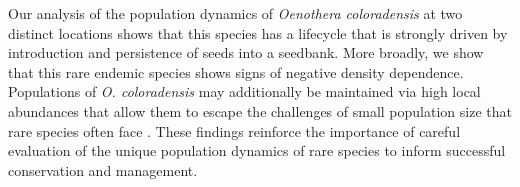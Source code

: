 \documentclass[12pt, letterpaper]{article}
\begin{document}

Our analysis of the population dynamics of \textit{Oenothera coloradensis} at two distinct locations shows that this species has a lifecycle that is strongly driven by introduction and persistence of seeds into a seedbank. More broadly, we show that this rare endemic species shows signs of negative density dependence. Populations of \textit{O. coloradensis} may additionally be maintained via high local abundances that allow them to escape the challenges of small population size that rare species often face \cite{Rabinowitz1981SevenRarity}. These findings reinforce the importance of careful evaluation of the unique population dynamics of rare species to inform successful conservation and management.  
\end{document}
